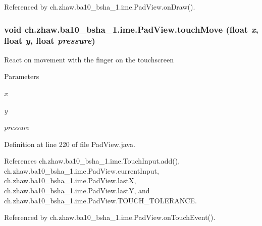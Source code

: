 Referenced by ch.zhaw.ba10\_\-bsha\_\-1.ime.PadView.onDraw().\hypertarget{classch_1_1zhaw_1_1ba10__bsha__1_1_1ime_1_1PadView_a04937ec9e314a781c98cad2b080e63df}{
\subsubsection[{touchMove}]{\setlength{\rightskip}{0pt plus 5cm}void ch.zhaw.ba10\_\-bsha\_\-1.ime.PadView.touchMove (float {\em x}, \/  float {\em y}, \/  float {\em pressure})}}
\label{classch_1_1zhaw_1_1ba10__bsha__1_1_1ime_1_1PadView_a04937ec9e314a781c98cad2b080e63df}
React on movement with the finger on the touchscreen


\begin{DoxyParams}{Parameters}
\item[{\em x}]\item[{\em y}]\item[{\em pressure}]\end{DoxyParams}


Definition at line 220 of file PadView.java.

References ch.zhaw.ba10\_\-bsha\_\-1.ime.TouchInput.add(), ch.zhaw.ba10\_\-bsha\_\-1.ime.PadView.currentInput, ch.zhaw.ba10\_\-bsha\_\-1.ime.PadView.lastX, ch.zhaw.ba10\_\-bsha\_\-1.ime.PadView.lastY, and ch.zhaw.ba10\_\-bsha\_\-1.ime.PadView.TOUCH\_\-TOLERANCE.

Referenced by ch.zhaw.ba10\_\-bsha\_\-1.ime.PadView.onTouchEvent().

